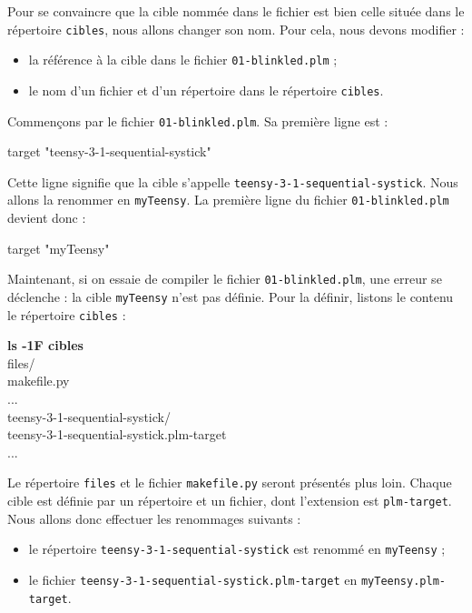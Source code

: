 Pour se convaincre que la cible nommée dans le fichier est bien celle située dans le répertoire \texttt{cibles}, nous allons changer son nom. Pour cela, nous devons modifier :
\begin{itemize}
  \item la référence à la cible dans le fichier \texttt{01-blinkled.plm} ;
  \item le nom d'un fichier et d'un répertoire dans le répertoire \texttt{cibles}. 
\end{itemize}

Commençons par le fichier \texttt{01-blinkled.plm}. Sa première ligne est :
\begin{PLM}[1]
target "teensy-3-1-sequential-systick"
\end{PLM}

Cette ligne signifie que la cible s'appelle \texttt{teensy-3-1-sequential-systick}. Nous allons la renommer en \texttt{myTeensy}. La première ligne du fichier \texttt{01-blinkled.plm} devient donc :

\begin{PLM}[1]
target "myTeensy"
\end{PLM}

Maintenant, si on essaie de compiler le fichier \texttt{01-blinkled.plm}, une erreur se déclenche : la cible \texttt{myTeensy} n'est pas définie. Pour la définir, listons le contenu le répertoire \texttt{cibles} :
\begin{SHELL}
{\bfseries ls -1F cibles}\\
f{}iles/\\
makef{}ile.py\\
...\\
teensy-3-1-sequential-systick/\\
teensy-3-1-sequential-systick.plm-target\\
...
\end{SHELL}

Le répertoire \texttt{f{}iles} et le fichier \texttt{makef{}ile.py} seront présentés plus loin. Chaque cible est définie par un répertoire et un fichier, dont l'extension est \texttt{plm-target}. Nous allons donc effectuer les renommages suivants :
\begin{itemize}
  \item le répertoire \texttt{teensy-3-1-sequential-systick} est renommé en \texttt{myTeensy} ;
  \item le fichier \texttt{teensy-3-1-sequential-systick.plm-target} en \texttt{myTeensy.plm-target}.
\end{itemize}

